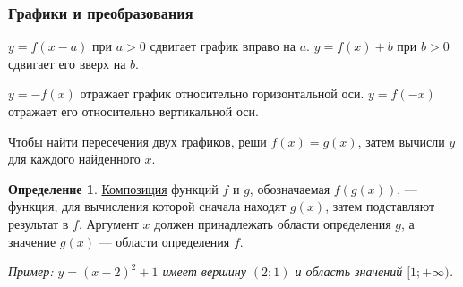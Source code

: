 \documentclass[12pt,a4paper]{article}
\theoremstyle{definition}
\newtheorem{definition}{Определение}[section]
\theoremstyle{plain}
\theoremstyle{remark}
\newcommand{\term}[1]{\uline{#1}}
\begin{document}
\subsubsection*{Графики и преобразования}
\(y = f (x - a)\) при \(a > 0\) сдвигает график вправо на \(a\). \(y = f (x) + b\) при \(b > 0\) сдвигает его вверх на \(b\).\par
\(y = - f (x)\) отражает график относительно горизонтальной оси. \(y = f (- x)\) отражает его относительно вертикальной оси.\par
Чтобы найти пересечения двух графиков, реши \(f (x) = g (x)\), затем вычисли \(y\) для каждого найденного \(x\).\par
\begin{definition}\term{Композиция} функций \(f\) и \(g\), обозначаемая \(f(g(x))\), — функция, для вычисления которой сначала находят \(g(x)\), затем подставляют результат в \(f\). Аргумент \(x\) должен принадлежать области определения \(g\), а значение \(g(x)\) — области определения \(f\).\end{definition}
{\small\textit{Пример: \(y = (x - 2)^{2} + 1\) имеет вершину \((2;\allowbreak 1)\) и область значений \([1;\allowbreak + \infty )\).}}\par
\end{document}
